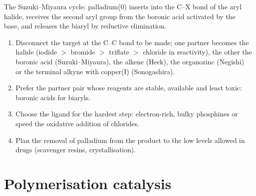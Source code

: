 \begin{omfigure}

{\small The Suzuki--Miyaura cycle: palladium(0) inserts into the C--X bond of the
aryl halide, receives the second aryl group from the boronic acid activated by
the base, and releases the biaryl by reductive elimination.}
\end{omfigure}

\begin{method}\label{met:b3:homogeneous-catalysis:choose-coupling}
\begin{enumerate}
  \item Disconnect the target at the C--C bond to be made; one partner becomes the
        halide (iodide $>$ bromide $>$ triflate $>$ chloride in reactivity), the other the
        boronic acid (Suzuki--Miyaura), the alkene (Heck), the organozinc
        (Negishi) or the terminal alkyne with copper(I) (Sonogashira).
  \item Prefer the partner pair whose reagents are stable, available and least
        toxic: boronic acids for biaryls.
  \item Choose the ligand for the hardest step: electron-rich, bulky phosphines
        or  speed the oxidative addition of chlorides.
  \item Plan the removal of palladium from the product to the low levels
        allowed in drugs (scavenger resins, crystallisation).
\end{enumerate}
\end{method}

\section{Polymerisation catalysis}

